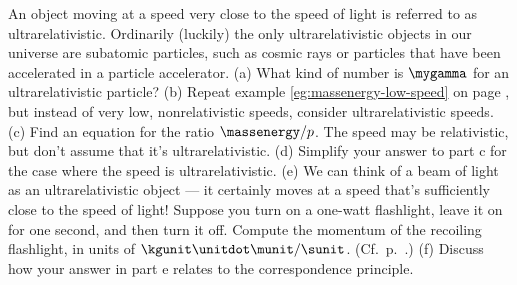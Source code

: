 An object moving at a speed very close to the speed of light is referred to as
ultrarelativistic. Ordinarily (luckily) the only ultrarelativistic objects
in our universe are subatomic particles, such as cosmic rays or particles
that have been accelerated in a particle accelerator.\hwendpart
(a) What kind of number is $\mygamma$ for an ultrarelativistic particle?\hwendpart
(b) Repeat example \ref{eg:massenergy-low-speed} on page \pageref{eg:massenergy-low-speed},
but instead of very low, nonrelativistic speeds, consider ultrarelativistic speeds.\hwendpart
(c) Find an equation for the ratio $\massenergy/p$. The speed may be relativistic, but don't
assume that it's ultrarelativistic.\answercheck\hwendpart
(d) Simplify your answer to part c for the case where the speed is ultrarelativistic.\answercheck\hwendpart
(e) We can think of a beam of light as an ultrarelativistic object --- it certainly moves at a speed
that's sufficiently close to the speed of light! Suppose you turn on a one-watt flashlight, leave it
on for one second, and then turn it off. Compute the momentum of the recoiling flashlight, in units
of $\kgunit\unitdot\munit/\sunit$. (Cf.~p.~\pageref{fig:maxwellian-momentum-of-light}.)\answercheck\hwendpart
(f) Discuss how your answer in part e relates to the correspondence principle.
